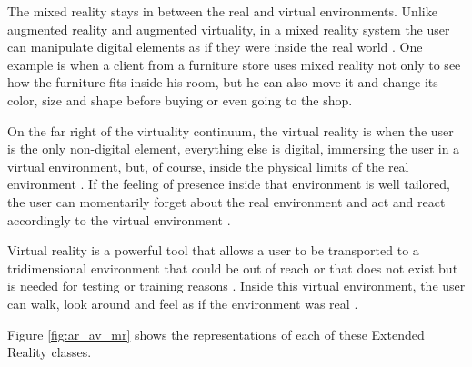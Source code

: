 The mixed reality stays in between the real and virtual environments. Unlike augmented reality and augmented virtuality, in a mixed reality system the user can manipulate digital elements as if they were inside the real world \cite{doolani2020review}. One example is when a client from a furniture store uses mixed reality not only to see how the furniture fits inside his room, but he can also move it and change its color, size and shape before buying or even going to the shop.
    
On the far right of the virtuality continuum, the virtual reality is when the user is the only non-digital element, everything else is digital, immersing the user in a virtual environment, but, of course, inside the physical limits of the real environment \cite{ma2007virtuality}. If the feeling of presence inside that environment is well tailored, the user can momentarily forget about the real environment and act and react accordingly to the virtual environment \cite{farrell2018learning}. 
    
Virtual reality is a powerful tool that allows a user to be transported to a tridimensional environment that could be out of reach or that does not exist but is needed for testing or training reasons \cite{mujber2004virtual}. Inside this virtual environment, the user can walk, look around and feel as if the environment was real \cite{salah2019virtual}.
    
Figure \ref{fig:ar_av_mr} shows the representations of each of these Extended Reality classes.
    
